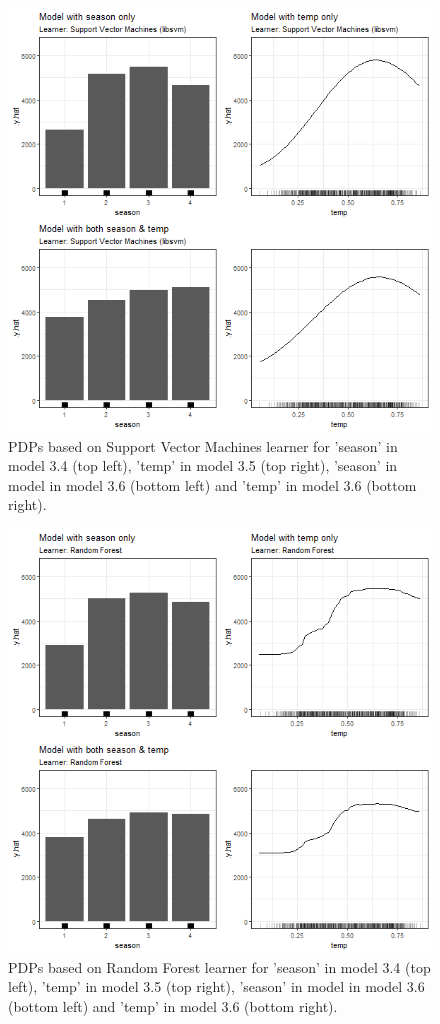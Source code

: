 \documentclass[]{krantz}
\begin{document}
\begin{figure}

{\centering \includegraphics[width=0.8\linewidth]{images/VK_PDP_12_Correlated_cat_num_SVM} 

}

\caption{PDPs based on Support Vector Machines learner for 'season' in model 3.4 (top left), 'temp' in model 3.5 (top right), 'season' in model in model 3.6 (bottom left) and 'temp' in model 3.6 (bottom right).}\label{fig:Figure12}
\end{figure}

\begin{figure}

{\centering \includegraphics[width=0.8\linewidth]{images/VK_PDP_13_Correlated_cat_num_RF} 

}

\caption{PDPs based on Random Forest learner for 'season' in model 3.4 (top left), 'temp' in model 3.5 (top right), 'season' in model in model 3.6 (bottom left) and 'temp' in model 3.6 (bottom right).}\label{fig:Figure13}
\end{figure}
\end{document}
